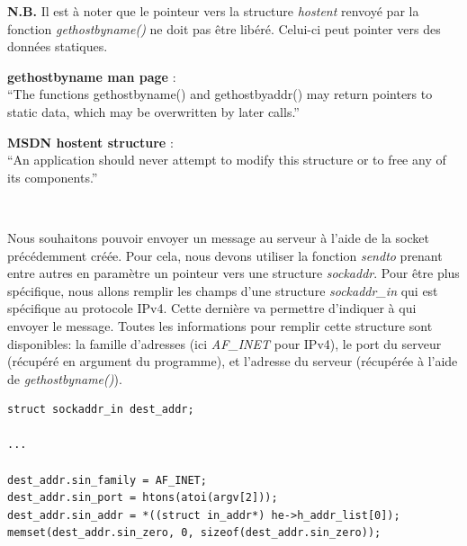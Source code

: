 \begin{mdframed}[backgroundcolor=lightblue2, linecolor=darkblue]
\noindent \textbf{N.B.} Il est à noter que le pointeur vers la structure \emph{hostent} renvoyé par la fonction \emph{gethostbyname()} ne doit pas être libéré. Celui-ci peut pointer vers des données statiques.

\begin{mdframed}[backgroundcolor=lightblue, linecolor=darkblue]
	\textbf{gethostbyname man page} :\\ %
	``The functions gethostbyname() and gethostbyaddr() may  return  pointers to  static  data, which may be overwritten by later calls.''
\end{mdframed}
\begin{mdframed}[backgroundcolor=lightblue, linecolor=darkblue]
	\noindent\textbf{MSDN hostent structure} :\\ %
	``An application should never attempt to modify this structure or to free any of its components.''
\end{mdframed}
\end{mdframed}
\

Nous souhaitons pouvoir envoyer un message au serveur à l'aide de la socket précédemment créée. Pour cela, nous devons utiliser la fonction \emph{sendto} prenant entre autres en paramètre un pointeur vers une structure \emph{sockaddr}. Pour être plus spécifique, nous allons remplir les champs d'une structure \emph{sockaddr\_in} qui est spécifique au protocole IPv4. Cette dernière va permettre d'indiquer à qui envoyer le message. Toutes les informations pour remplir cette structure sont disponibles: la famille d'adresses (ici \emph{AF\_INET} pour IPv4), le port du serveur (récupéré en argument du programme), et l'adresse du serveur (récupérée à l'aide de \emph{gethostbyname()}).

\begin{lstlisting}
struct sockaddr_in dest_addr;

...

dest_addr.sin_family = AF_INET;
dest_addr.sin_port = htons(atoi(argv[2]));
dest_addr.sin_addr = *((struct in_addr*) he->h_addr_list[0]);
memset(dest_addr.sin_zero, 0, sizeof(dest_addr.sin_zero));
\end{lstlisting}
\

